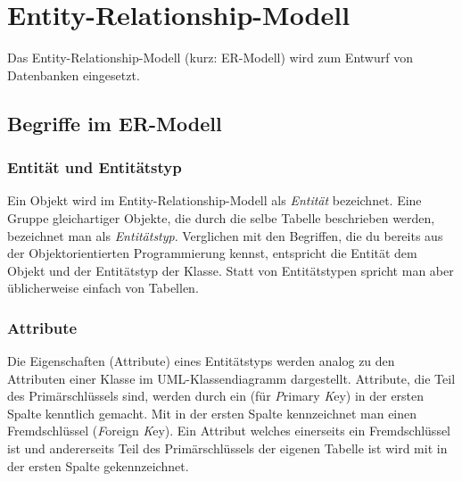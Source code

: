 \chapter{Entity-Relationship-Modell}
\renewcommand{\chaptertitle}{Entity-Relationship-Modell}

\lehead[]{\normalfont\sffamily\hspace*{-2.00cm}\textcolor{white}{\colorbox{lightblue}{\makebox[1.60cm][r]{\thechapter}}}\hspace{0.17cm}\textcolor{lightblue}{\chaptertitle}}
\rohead[]{\textcolor{lightblue}{\chaptertitle}\normalfont\sffamily\hspace*{0.17cm}\textcolor{white}{\colorbox{lightblue}{\makebox[1.60cm][l]{\thechapter}}}\hspace{-2.00cm}}
\rehead[]{\textcolor{lightblue}{AvHG, Inf, My}}
\lohead[]{\textcolor{lightblue}{AvHG, Inf, My}}


Das Entity-Relationship-Modell (kurz: ER-Modell) wird zum Entwurf von
Datenbanken eingesetzt.

\section{Begriffe im ER-Modell}

\subsection{Entität und Entitätstyp}

Ein Objekt wird im Entity-Relationship-Modell als \textit{Entität} bezeichnet.
Eine Gruppe gleichartiger Objekte, die durch die selbe Tabelle beschrieben 
werden, bezeichnet man als \textit{Entitätstyp}. Verglichen mit den Begriffen, 
die du bereits aus der Objektorientierten Programmierung kennst, entspricht die 
Entität dem Objekt und der Entitätstyp der Klasse. Statt von Entitätstypen
spricht man aber üblicherweise einfach von Tabellen.

\subsection{Attribute}

Die Eigenschaften (Attribute) eines Entitätstyps werden analog zu den Attributen
einer Klasse im UML-Klassendiagramm dargestellt. Attribute, die Teil des
Primärschlüssels sind, werden durch ein  (für
\textit{P}rimary \textit{K}ey) in der ersten Spalte kenntlich gemacht. Mit
 in der ersten Spalte kennzeichnet man einen Fremdschlüssel
(\textit{F}oreign \textit{K}ey). Ein Attribut welches einerseits ein
Fremdschlüssel ist und andererseits Teil des Primärschlüssels der eigenen
Tabelle ist wird mit  in der ersten Spalte gekennzeichnet.

